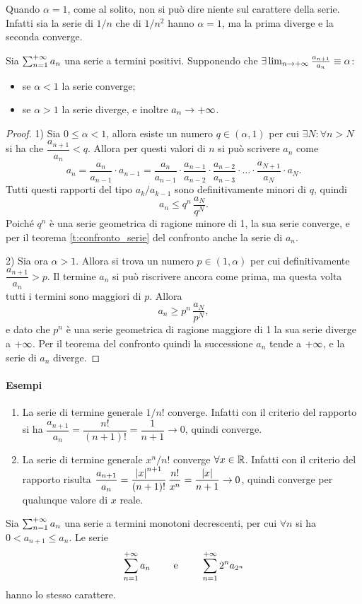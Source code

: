 Quando $\alpha=1$, come al solito, non si può dire niente sul carattere della serie. Infatti sia la serie di $1/n$ che di $1/n^2$ hanno $\alpha=1$, ma la prima diverge e la seconda converge.
\begin{teorema}
\label{t:criterio_rapporto_serie}
Sia $\sum_{{n}=1}^{+\infty}a_n$ una serie a termini positivi. Supponendo che $\exists\lim_{n\to+\infty}\frac{a_{n+1}}{a_n}\equiv\alpha$:
\begin{itemize}
\item se $\alpha<1$ la serie converge;
\item se $\alpha>1$ la serie diverge, e inoltre $a_n\to+\infty$.
\end{itemize}
\end{teorema}
\begin{proof}
1) Sia $0\leq\alpha<1$, allora esiste un numero $q\in(\alpha,1)$ per cui $\exists N\colon\forall n>N$ si ha che $\dfrac{a_{n+1}}{a_n}<q$. Allora per questi valori di $n$ si può scrivere $a_n$ come
\[
a_n=\frac{a_n}{a_{n-1}}\cdot a_{n-1}=\frac{a_n}{a_{n-1}}\cdot\frac{a_{n-1}}{a_{n-2}}\cdot\frac{a_{n-2}}{a_{n-3}}\cdot\dots\cdot\frac{a_{N+1}}{a_N}\cdot a_N.
\]
Tutti questi rapporti del tipo $a_k/a_{k-1}$ sono definitivamente minori di $q$, quindi
\[
a_n\leq q^n\,\frac{a_N}{q^N}.
\]
Poiché $q^n$ è una serie geometrica di ragione minore di 1, la sua serie converge, e per il teorema \ref{t:confronto_serie} del confronto anche la serie di $a_n$.

2) Sia ora $\alpha>1$. Allora si trova un numero $p\in(1,\alpha)$ per cui definitivamente $\dfrac{a_{n+1}}{a_n}>p$. Il termine $a_n$ si può riscrivere ancora come prima, ma questa volta tutti i termini sono maggiori di $p$. Allora
\[
a_n\geq p^n\,\frac{a_N}{p^N},
\]
e dato che $p^n$ è una serie geometrica di ragione maggiore di 1 la sua serie diverge a $+\infty$. Per il teorema del confronto quindi la successione $a_n$ tende a $+\infty$, e la serie di $a_n$ diverge.
\end{proof}
\paragraph{Esempi}
\begin{enumerate}
\item La serie di termine generale $1/n!$ converge. Infatti con il criterio del rapporto si ha $\dfrac{a_{n+1}}{a_n}=\dfrac{n!}{(n+1)!}=\dfrac1{n+1}\to 0$, quindi converge.
\item La serie di termine generale $x^n/n!$ converge $\forall x\in\mathbb{R}$. Infatti con il criterio del rapporto risulta $\dfrac{a_{n+1}}{a_n}=\dfrac{\left|{x}\right|^{n+1}}{(n+1)!}\,\dfrac{n!}{x^n}=\dfrac{\left|{x}\right|}{n+1}\to 0$, quindi converge per qualunque valore di $x$ reale.
\end{enumerate}
\begin{teorema}
Sia $\sum_{{n}=1}^{+\infty}a_n$ una serie a termini monotoni decrescenti, per cui $\forall n$ si ha $0<a_{n+1}\leq a_n$. Le serie
\[
\sum_{{n}=1}^{+\infty}a_n\qquad\text{ e }\qquad\sum_{{n}=1}^{+\infty}2^na_{2^n}
\]
hanno lo stesso carattere.
\end{teorema}

